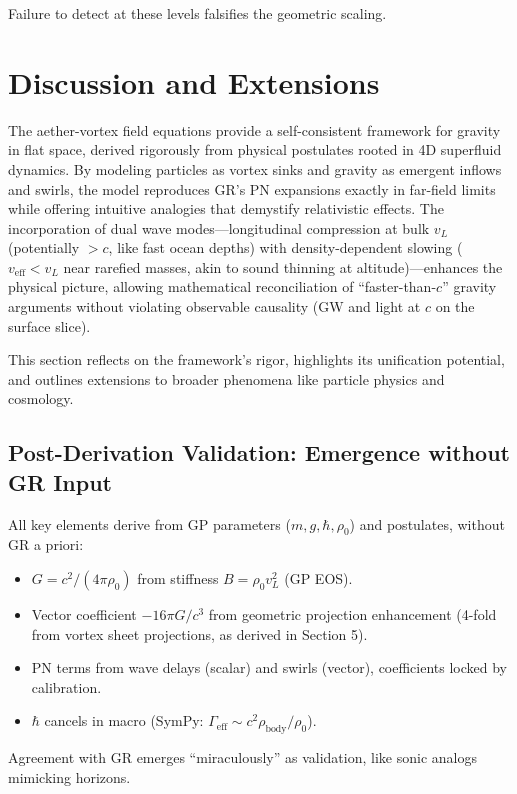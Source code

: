 \documentclass{article}
\begin{document}
Failure to detect at these levels falsifies the geometric scaling.

\section{Discussion and Extensions}

The aether-vortex field equations provide a self-consistent framework for gravity in flat space, derived rigorously from physical postulates rooted in 4D superfluid dynamics. By modeling particles as vortex sinks and gravity as emergent inflows and swirls, the model reproduces GR's PN expansions exactly in far-field limits while offering intuitive analogies that demystify relativistic effects. The incorporation of dual wave modes---longitudinal compression at bulk $v_L$ (potentially $>c$, like fast ocean depths) with density-dependent slowing ($v_{\text{eff}} < v_L$ near rarefied masses, akin to sound thinning at altitude)---enhances the physical picture, allowing mathematical reconciliation of ``faster-than-$c$'' gravity arguments without violating observable causality (GW and light at $c$ on the surface slice).

This section reflects on the framework's rigor, highlights its unification potential, and outlines extensions to broader phenomena like particle physics and cosmology.

\subsection{Post-Derivation Validation: Emergence without GR Input}

All key elements derive from GP parameters ($m, g, \hbar, \rho_0$) and postulates, without GR a priori:

\begin{itemize}
  \item $G = c^2 / (4\pi \rho_0)$ from stiffness $B = \rho_0 v_L^2$ (GP EOS).
  \item Vector coefficient $-16\pi G / c^3$ from geometric projection enhancement (4-fold from vortex sheet projections, as derived in Section 5).
  \item PN terms from wave delays (scalar) and swirls (vector), coefficients locked by calibration.
  \item $\hbar$ cancels in macro (SymPy: $\Gamma_{\text{eff}} \sim c^2 \rho_{\text{body}} / \rho_0$).
\end{itemize}

Agreement with GR emerges ``miraculously'' as validation, like sonic analogs mimicking horizons.
\end{document}
